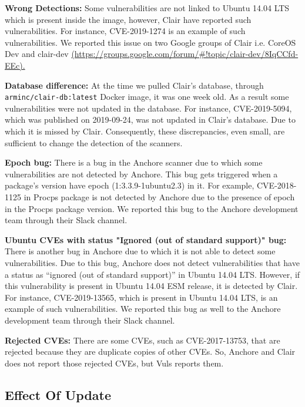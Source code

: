 \documentclass[a4paper,num-refs]{oup-contemporary}
\begin{document}
\textbf{Wrong Detections:} 
Some vulnerabilities are not linked to Ubuntu 14.04 LTS which is 
present inside the image, however, Clair have reported such vulnerabilities.
For instance, CVE-2019-1274 is an example of such vulnerabilities. 
We reported this issue on two Google groups of Clair i.e. CoreOS Dev and
clair-dev \url{(https://groups.google.com/forum/\#!topic/clair-dev/8IqCCfd-EEc).}

\textbf{Database difference:} At the time we pulled Clair's database, through \texttt{arminc/clair-db:latest} Docker image, it was one week old.
                              As a result some vulnerabilities were not updated in the database. For instance, CVE-2019-5094, which
		              was published on 2019-09-24, was not 
		              updated in Clair's database. Due to which it is missed by Clair.
			      Consequently, these discrepancies, even small, are sufficient to change the detection of
			      the scanners.

\textbf{Epoch bug:} There is a bug in the Anchore scanner due to which some vulnerabilities are 
		not detected by Anchore. This bug gets triggered when a package’s version have epoch 
		(1:3.3.9-1ubuntu2.3) in it. For example, CVE-2018-1125 in Procps package is not
		detected by Anchore due to the presence of epoch in the Procps package version.
		We reported this bug to the Anchore development team through their Slack channel.

\textbf{Ubuntu CVEs with status "Ignored (out of standard support)" bug:} There is another bug in Anchore due to 
		which it is not able to detect some vulnerabilities. Due to this bug, Anchore does not detect 
		vulnerabilities that have a status as “ignored (out of standard support)” in Ubuntu 14.04 LTS. 
		However, if this vulnerability is present in Ubuntu 14.04 ESM release, it is detected by Clair. 
		For instance, CVE-2019-13565, which is present in Ubuntu 14.04 LTS, is an example of such vulnerabilities. 
		We reported this bug as well to the Anchore development team through their Slack
		channel.

\textbf{Rejected CVEs:} There are some CVEs, such as CVE-2017-13753, that are rejected because they are duplicate copies of other CVEs. 
	So, Anchore and Clair does not report those rejected CVEs, but Vuls reports them.

\subsection{Effect Of Update}
\end{document}
